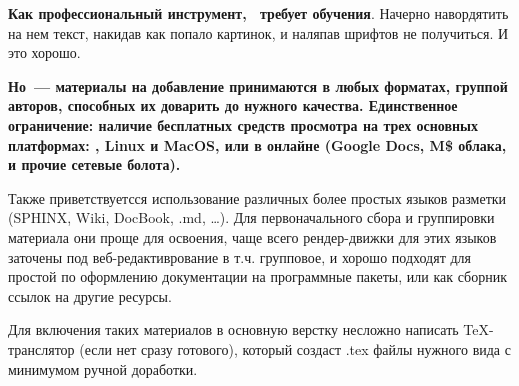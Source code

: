\bigskip
\textbf{Как профессиональный инструмент, \latex\ требует обучения}. Начерно
навордятить на нем текст, накидав как попало картинок, и наляпав
шрифтов не
получиться. И это хорошо.

\bigskip
\textbf{Но\ --- материалы на добавление принимаются в любых форматах, группой
авторов, способных их доварить до нужного качества. Единственное ограничение:
наличие бесплатных средств просмотра на трех основных платформах: \win, Linux и
MacOS, или в онлайне (Google Docs, M\$ облака, и прочие сетевые болота).}

\bigskip
Также приветствуетсся использование различных более простых языков разметки
(SPHINX, Wiki, DocBook, .md, \ldots). Для первоначального сбора и группировки
материала они проще для освоения, чаще всего рендер-движки для этих языков
заточены под веб-редактиврование в т.ч. групповое, и хорошо подходят для простой
по оформлению документации на программные пакеты, или как сборник ссылок на
другие ресурсы.

Для включения таких материалов в основную верстку несложно написать
\TeX-транслятор (если нет сразу готового), который создаст .tex файлы нужного
вида с минимумом ручной доработки.
